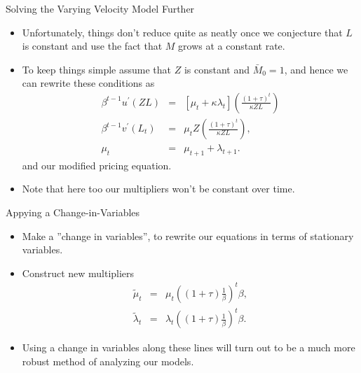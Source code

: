 \documentclass[10pt,c,aspectratio=1610,handout]{beamer}
\begin{document}
\begin{frame}{Solving the Varying Velocity Model Further}%
  \begin{itemize}%
    \item[$\blacktriangleright$] Unfortunately, things don't reduce quite as neatly once we conjecture that $L$ is constant and use the fact that $M$ grows at a constant rate.
    \pause%
    \item[$\blacktriangleright$] To keep things simple assume that $Z$ is constant and $\bar{M}_0 = 1$, and hence we can rewrite these conditions as%
      \begin{eqnarray*}%
        \beta ^{t-1}u^{\prime }(ZL) &=&\left[ \mu _{t}+\kappa \lambda _{t}\right] \left( \frac{(1+\tau )^{t}}{\kappa ZL}\right) \\%
        \beta ^{t-1}v^{\prime }(L_{t}) &=&\mu _{t}Z\left( \frac{(1+\tau )^{t}}{\kappa ZL}\right) , \\%
        \mu _{t} &=&\mu _{t+1}+\lambda _{t+1}.%
      \end{eqnarray*}%
    and our modified pricing equation.%
    \pause%
    \bigskip%
    \item[$\Rightarrow$] Note that here too our multipliers won't be constant over time.%
  \end{itemize}%
\end{frame}%
\begin{frame}{Appying a Change-in-Variables}%
  \begin{itemize}%
    \item[$\blacktriangleright$] Make a ''change in variables'', to rewrite our equations in terms of stationary variables.%
    \pause%
    \item[$\blacktriangleright$] Construct new multipliers%
      \begin{eqnarray*}%
        \tilde{\mu}_{t} & = & \mu_{t} \left( (1+\tau) \frac{1}{\beta} \right)^{t} \beta, \label{eq:changevars1}\\%
        \tilde{\lambda}_{t} & = & \lambda_{t} \left( (1+\tau) \frac{1}{\beta} \right)^{t} \beta.%
      \end{eqnarray*}%
    \pause%
    \item[$\blacktriangleright$] Using a change in variables along these lines will turn out to be a much more robust method of analyzing our models.%
  \end{itemize}%
\end{frame}%
\end{document}

